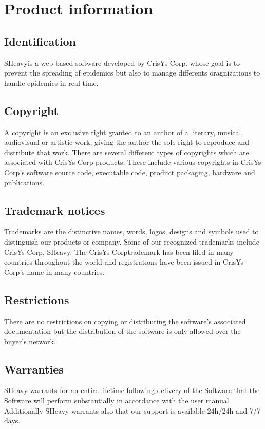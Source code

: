 \chapter{Product information}
\vspace{-6em}

\section{Identification}
SHeavy\textregistered is a web based software developed by CrisYs Corp. whose goal is to
prevent the spreading of epidemics but also to manage differents oragnizations to handle epidemics
in real time.

\section{Copyright}
A copyright is an exclusive right granted to an author of a literary, musical,
audiovisual or artistic work, giving the author the sole right to reproduce and distribute that work. 
There are several different types of copyrights which are associated with CrisYs
Corp products. These include various copyrights in CrisYs Corp's
software source code, executable code, product packaging, hardware and publications.

\section{Trademark notices}
Trademarks are the distinctive names, words, logos, designs and symbols used to distinguish our
products or company. Some of our recognized trademarks include CrisYs
Corp\textregistered, SHeavy\textregistered. The CrisYs Corp\textregistered trademark has been filed
in many countries throughout the world and registrations have been issued in
CrisYs Corp's name in many countries. 

\section{Restrictions}
There are no restrictions on copying or distributing the
software's associated documentation but the distribution of the software is only
allowed over the buyer's network.

\section{Warranties}
SHeavy warrants for an entire lifetime following delivery of the Software that
the Software will perform substantially in accordance with the user manual.
Additionally SHeavy warrants also that our support is available 24h/24h and
7/7 days.

